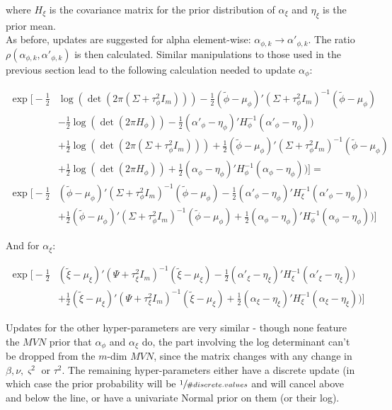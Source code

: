 \documentclass{article}
\begin{document}
where $H_\xi$ is the covariance matrix for the prior distribution of $\alpha_\xi$ and $\eta_\xi$ is the prior mean. \\

As before, updates are suggested for alpha element-wise: $\alpha_{\phi,k} \to \alpha'_{\phi,k}$. The ratio $\rho(\alpha_{\phi,k}, \alpha'_{\phi,k})$ is then calculated. Similar manipulations to those used in the previous section lead to the following calculation needed to update $\alpha_\phi$:

\begin{align}
\exp \Big[ - \frac{1}{2} & \log(\det(2 \pi (\Sigma + \tau^2_\phi I_m))) -\frac{1}{2} (\tilde{\phi} - \mu_\phi)' (\Sigma + \tau^2_\phi I_m)^{-1} (\tilde{\phi} - \mu_\phi) \nonumber \\
& - \frac{1}{2} \log(\det(2 \pi H_\phi)) -\frac{1}{2} (\alpha'_\phi - \eta_\phi)' H_\phi^{-1} (\alpha'_\phi - \eta_\phi) ) \nonumber \\
& + \frac{1}{2} \log(\det(2 \pi (\Sigma + \tau^2_\phi I_m))) + \frac{1}{2} (\tilde{\phi} - \mu_\phi)' (\Sigma + \tau^2_\phi I_m)^{-1} (\tilde{\phi} - \mu_\phi) \nonumber \\
& + \frac{1}{2} \log(\det(2 \pi H_\phi)) + \frac{1}{2} (\alpha_\phi - \eta_\phi)' H_\phi^{-1} (\alpha_\phi - \eta_\phi) )
\Big] = \nonumber \\
\exp \Big[ -\frac{1}{2} & (\tilde{\phi} - \mu_\phi)' (\Sigma + \tau^2_\phi I_m)^{-1} (\tilde{\phi} - \mu_\phi) -\frac{1}{2} (\alpha'_\phi - \eta_\phi)' H_\xi^{-1} (\alpha'_\phi - \eta_\phi) ) \nonumber \\
& + \frac{1}{2} (\tilde{\phi} - \mu_\phi)' (\Sigma + \tau^2_\phi I_m)^{-1} (\tilde{\phi} - \mu_\phi) + \frac{1}{2} (\alpha_\phi - \eta_\phi)' H_\phi^{-1} (\alpha_\phi - \eta_\phi) )
\Big] \label{eq:2a1}
\end{align}

And for $\alpha_\xi$:

\begin{align}
\exp \Big[ -\frac{1}{2} & (\tilde{\xi} - \mu_\xi)' (\Psi + \tau^2_\xi I_m)^{-1} (\tilde{\xi} - \mu_\xi) -\frac{1}{2} (\alpha'_\xi - \eta_\xi)' H_\xi^{-1} (\alpha'_\xi - \eta_\xi) ) \nonumber \\
& + \frac{1}{2} (\tilde{\xi} - \mu_\xi)' (\Psi + \tau^2_\xi I_m)^{-1} (\tilde{\xi} - \mu_\xi) + \frac{1}{2} (\alpha_\xi - \eta_\xi)' H_\xi^{-1} (\alpha_\xi - \eta_\xi) )
\Big] \label{eq:2a2}
\end{align}

Updates for the other hyper-parameters are very similar - though none feature the $MVN$ prior that $\alpha_\phi$ and $\alpha_\xi$ do, the part involving the log determinant can't be dropped from the $m$-dim $MVN$, since the matrix changes with any change in $\beta, \nu, \varsigma^2$ or $\tau^2$. The remaining hyper-parameters either have a discrete update (in which case the prior probability will be $\sfrac{1}{\#discrete.values}$ and will cancel above and below the line, or have a univariate Normal prior on them (or their log). \\
\end{document}
